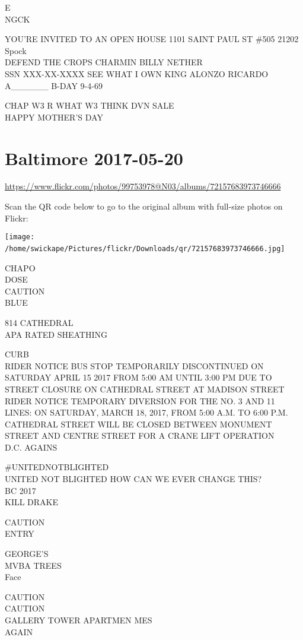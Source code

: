 \documentclass[10pt,letterpaper]{article}
\begin{document}
E\\
NGCK

YOU'RE INVITED TO AN OPEN HOUSE 1101 SAINT PAUL ST \#505 21202\\
Spock\\
DEFEND THE CROPS CHARMIN BILLY NETHER\\
SSN XXX{-}XX{-}XXXX SEE WHAT I OWN KING ALONZO RICARDO A\_\_\_\_\_\_ B{-}DAY 9{-}4{-}69

CHAP W3 R WHAT W3 THINK DVN SALE\\
HAPPY MOTHER'S DAY
\

\section*{Baltimore 2017-05-20}

\url{https://www.flickr.com/photos/99753978@N03/albums/72157683973746666}

Scan the QR code below to go to the original album with full-size photos on Flickr:

\texttt{[image: /home/swickape/Pictures/flickr/Downloads/qr/72157683973746666.jpg]}
\

CHAPO\\
DOSE\\
CAUTION\\
BLUE

814 CATHEDRAL\\
APA RATED SHEATHING

CURB\\
RIDER NOTICE BUS STOP TEMPORARILY DISCONTINUED ON SATURDAY APRIL 15 2017 FROM 5:00 AM UNTIL 3:00 PM DUE TO STREET CLOSURE ON CATHEDRAL STREET AT MADISON STREET\\
RIDER NOTICE TEMPORARY DIVERSION FOR THE NO. 3 AND 11 LINES: ON SATURDAY, MARCH 18, 2017, FROM 5:00 A.M. TO 6:00 P.M. CATHEDRAL STREET WILL BE CLOSED BETWEEN MONUMENT STREET AND CENTRE STREET FOR A CRANE LIFT OPERATION\\
D.C. AGAINS

\#UNITEDNOTBLIGHTED\\
UNITED NOT BLIGHTED HOW CAN WE EVER CHANGE THIS?\\
BC 2017\\
KILL DRAKE

CAUTION\\
ENTRY

GEORGE'S\\
MVBA TREES\\
Face

CAUTION\\
CAUTION\\
GALLERY TOWER APARTMEN MES\\
AGAIN
\end{document}
